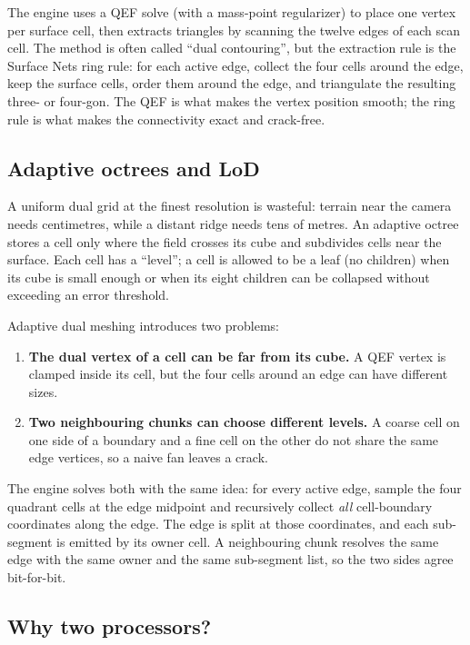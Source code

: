 The engine uses a QEF solve (with a mass-point regularizer) to place one
vertex per surface cell, then extracts triangles by scanning the twelve
edges of each scan cell.  The method is often called ``dual contouring'',
but the extraction rule is the Surface Nets ring rule: for each active
edge, collect the four cells around the edge, keep the surface cells,
order them around the edge, and triangulate the resulting three- or
four-gon.  The QEF is what makes the vertex position smooth; the ring rule
is what makes the connectivity exact and crack-free.

\subsection{Adaptive octrees and LoD}

A uniform dual grid at the finest resolution is wasteful: terrain near the
camera needs centimetres, while a distant ridge needs tens of metres.
An adaptive octree stores a cell only where the field crosses its cube and
subdivides cells near the surface.  Each cell has a ``level''; a cell is
allowed to be a leaf (no children) when its cube is small enough or when
its eight children can be collapsed without exceeding an error threshold.

Adaptive dual meshing introduces two problems:

\begin{enumerate}
\item \textbf{The dual vertex of a cell can be far from its cube.}  A QEF
  vertex is clamped inside its cell, but the four cells around an edge can
  have different sizes.
\item \textbf{Two neighbouring chunks can choose different levels.}  A
  coarse cell on one side of a boundary and a fine cell on the other do
  not share the same edge vertices, so a naive fan leaves a crack.
\end{enumerate}

The engine solves both with the same idea: for every active edge, sample
the four quadrant cells at the edge midpoint and recursively collect
\emph{all} cell-boundary coordinates along the edge.  The edge is split at
those coordinates, and each sub-segment is emitted by its owner cell.  A
neighbouring chunk resolves the same edge with the same owner and the same
sub-segment list, so the two sides agree bit-for-bit.

\subsection{Why two processors?}

